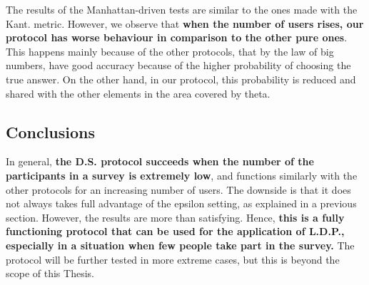 The results of the Manhattan-driven tests are similar to the ones made with the Kant. metric. However, we observe that \textbf{when the number of users rises, our protocol has worse behaviour in comparison to the other pure ones}. This happens mainly because of the other protocols, that by the law of big numbers, have good accuracy because of the higher probability of choosing the true answer. On the other hand, in our protocol, this probability is reduced and shared with the other elements in the area covered by theta. 

\subsection{Conclusions}
In general, \textbf{the D.S. protocol succeeds when the number of the participants in a survey is extremely low}, and functions similarly with the other protocols for an increasing number of users. The downside is that it does not always takes full advantage of the epsilon setting, as explained in a previous section. However, the results are more than satisfying. Hence, \textbf{this is a fully functioning protocol that can be used for the application of L.D.P., especially in a situation when few people take part in the survey.} The protocol will be further tested in more extreme cases, but this is beyond the scope of this Thesis.

